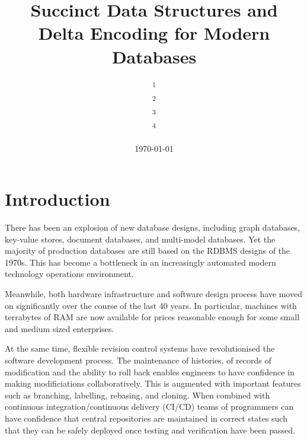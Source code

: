 \documentclass[10pt, a4paper, twocolumn]{article} %
\title{Succinct Data Structures and Delta Encoding for Modern Databases}
\author{
  \authorstyle{Matthijs van Otterdijk\textsuperscript{1,2} and Gavin Mendel-Gleason\textsuperscript{1,3} and Kevin Feeney\textsuperscript{1,4}}
  \newline\newline
  \textsuperscript{1}\institution{TerminusDB {\protect\url{http://terminusdb.com}}}\\
  \textsuperscript{2}\institution{\protect\url{matthijs@datachemist.com}}\\
  \textsuperscript{3}\institution{\protect\url{gavin@datachemist.com}}\\
  \textsuperscript{4}\institution{\protect\url{kevin@datachemist.com}}
}
\date{\today}
\begin{document}
\maketitle

\thispagestyle{firstpage}


\section{Introduction}

There has been an explosion of new database designs, including graph
databases, key-value stores, document databases, and multi-model
databases. Yet the majority of production databases are still based on
the RDBMS designs of the 1970s\cite{Codd:1970:RMD:362384.362685}. This
has become a bottleneck in an increasingly automated modern technology
operations environment.

Meanwhile, both hardware infrastructure and software design process
have moved on significantly over the course of the last 40 years. In
particular, machines with terrabytes of RAM are now available for
prices reasonable enough for some small and medium sized enterprises.

At the same time, flexible revision control systems have
revolutionised the software development process. The maintenance of
histories, of records of modification and the ability to roll back
enables engineers to have confidence in making modificiations
collaboratively. This is augmented with important features such as
branching, labelling, rebasing, and cloning. When combined with
continuous integration/continuous
delivery\cite{65147}\cite{LAUKKANEN201755} (CI/CD) teams of
programmers can have confidence that central repositories are
maintained in correct states such that they can be safely deployed
once testing and verification have been passed.
\end{document}

